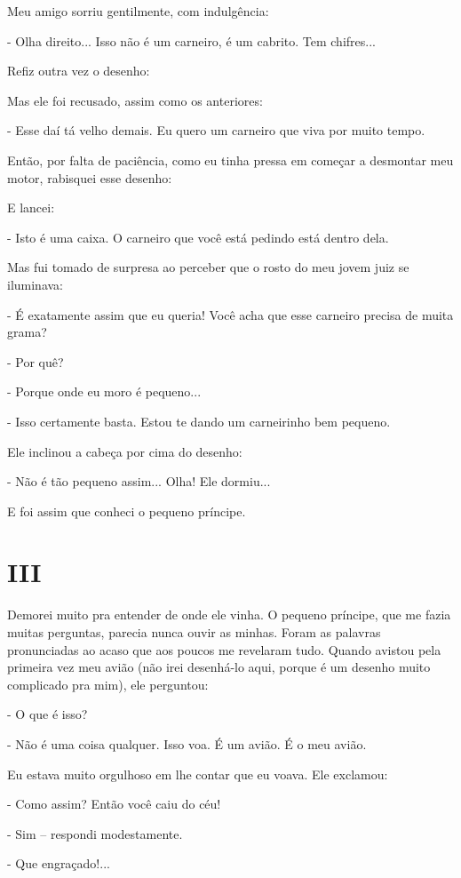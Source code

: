 Meu amigo sorriu gentilmente, com indulgência:

- Olha direito... Isso não é um carneiro, é um cabrito. Tem chifres...

Refiz outra vez o desenho:

Mas ele foi recusado, assim como os anteriores:

- Esse daí tá velho demais. Eu quero um carneiro que viva por muito
tempo.

Então, por falta de paciência, como eu tinha pressa em começar a
desmontar meu motor, rabisquei esse desenho:

E lancei:

- Isto é uma caixa. O carneiro que você está pedindo está dentro dela.

Mas fui tomado de surpresa ao perceber que o rosto do meu jovem juiz se
iluminava:

- É exatamente assim que eu queria! Você acha que esse carneiro precisa
de muita grama?

- Por quê?

- Porque onde eu moro é pequeno...

- Isso certamente basta. Estou te dando um carneirinho bem pequeno.

Ele inclinou a cabeça por cima do desenho:

- Não é tão pequeno assim... Olha! Ele dormiu...

E foi assim que conheci o pequeno príncipe.

\chapter{III}

Demorei muito pra entender de onde ele vinha. O pequeno príncipe, que me
fazia muitas perguntas, parecia nunca ouvir as minhas. Foram as palavras
pronunciadas ao acaso que aos poucos me revelaram tudo. Quando avistou
pela primeira vez meu avião (não irei desenhá-lo aqui, porque é um
desenho muito complicado pra mim), ele perguntou:

- O que é isso?

- Não é uma coisa qualquer. Isso voa. É um avião. É o meu avião.

Eu estava muito orgulhoso em lhe contar que eu voava. Ele exclamou:

- Como assim? Então você caiu do céu!

- Sim -- respondi modestamente.

- Que engraçado!...

